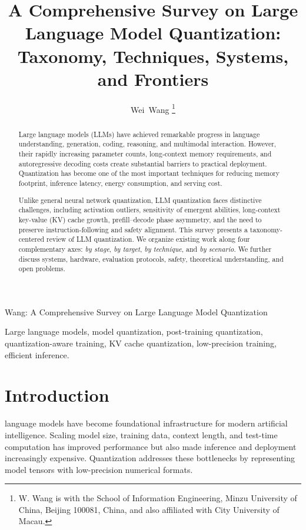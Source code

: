 \documentclass[journal,10pt]{IEEEtran}
\begin{document}
\title{A Comprehensive Survey on Large Language Model Quantization:\\
Taxonomy, Techniques, Systems, and Frontiers}

\author{
  Wei~Wang
  \thanks{W. Wang is with the School of Information Engineering, Minzu University of China, Beijing 100081, China, and also affiliated with City University of Macau.}
}

{Wang: A Comprehensive Survey on Large Language Model Quantization}

\maketitle

\begin{abstract}
Large language models (LLMs) have achieved remarkable progress in language understanding, generation, coding, reasoning, and multimodal interaction. However, their rapidly increasing parameter counts, long-context memory requirements, and autoregressive decoding costs create substantial barriers to practical deployment. Quantization has become one of the most important techniques for reducing memory footprint, inference latency, energy consumption, and serving cost.

Unlike general neural network quantization, LLM quantization faces distinctive challenges, including activation outliers, sensitivity of emergent abilities, long-context key-value (KV) cache growth, prefill--decode phase asymmetry, and the need to preserve instruction-following and safety alignment. This survey presents a taxonomy-centered review of LLM quantization. We organize existing work along four complementary axes: \emph{by stage}, \emph{by target}, \emph{by technique}, and \emph{by scenario}. We further discuss systems, hardware, evaluation protocols, safety, theoretical understanding, and open problems.
\end{abstract}

\begin{IEEEkeywords}
Large language models, model quantization, post-training quantization, quantization-aware training, KV cache quantization, low-precision training, efficient inference.
\end{IEEEkeywords}

\section{Introduction}
 language models have become foundational infrastructure for modern artificial intelligence. Scaling model size, training data, context length, and test-time computation has improved performance but also made inference and deployment increasingly expensive. Quantization addresses these bottlenecks by representing model tensors with low-precision numerical formats.
\end{document}

